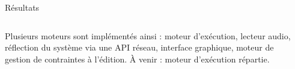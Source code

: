 \begin{columns}[t]
\begin{column}{\onecolwid}
\begin{block}{Résultats}
\begin{columns}[t]
\begin{column}{\onecolwid}
                      Plusieurs moteurs sont implémentés ainsi : moteur d'exécution, 
                      lecteur audio, réflection du système via une API réseau, interface graphique, 
                      moteur de gestion de contraintes à l'édition. À venir : moteur d'exécution répartie.
          		\end{column}
          	\end{columns}        
            \end{block}
        \end{column}         
   \begin{column}{\sepwid}\end{column}		
\end{columns}

